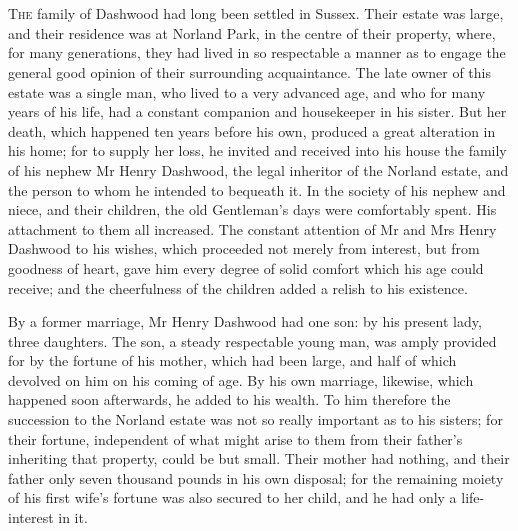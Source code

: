 \chapter[Chapter \thechapter]{}
\lettrine[lines=4,lraise=0.3]{T}{he} family of Dashwood had long been settled in Sussex. Their estate was large, and their residence was at Norland Park, in the centre of their property, where, for many generations, they had lived in so respectable a manner as to engage the general good opinion of their surrounding acquaintance. The late owner of this estate was a single man, who lived to a very advanced age, and who for many years of his life, had a constant companion and housekeeper in his sister. But her death, which happened ten years before his own, produced a great alteration in his home; for to supply her loss, he invited and received into his house the family of his nephew Mr Henry Dashwood, the legal inheritor of the Norland estate, and the person to whom he intended to bequeath it. In the society of his nephew and niece, and their children, the old Gentleman’s days were comfortably spent. His attachment to them all increased. The constant attention of Mr and Mrs Henry Dashwood to his wishes, which proceeded not merely from interest, but from goodness of heart, gave him every degree of solid comfort which his age could receive; and the cheerfulness of the children added a relish to his existence.

By a former marriage, Mr Henry Dashwood had one son: by his present lady, three daughters. The son, a steady respectable young man, was amply provided for by the fortune of his mother, which had been large, and half of which devolved on him on his coming of age. By his own marriage, likewise, which happened soon afterwards, he added to his wealth. To him therefore the succession to the Norland estate was not so really important as to his sisters; for their fortune, independent of what might arise to them from their father’s inheriting that property, could be but small. Their mother had nothing, and their father only seven thousand pounds in his own disposal; for the remaining moiety of his first wife’s fortune was also secured to her child, and he had only a life-interest in it.

